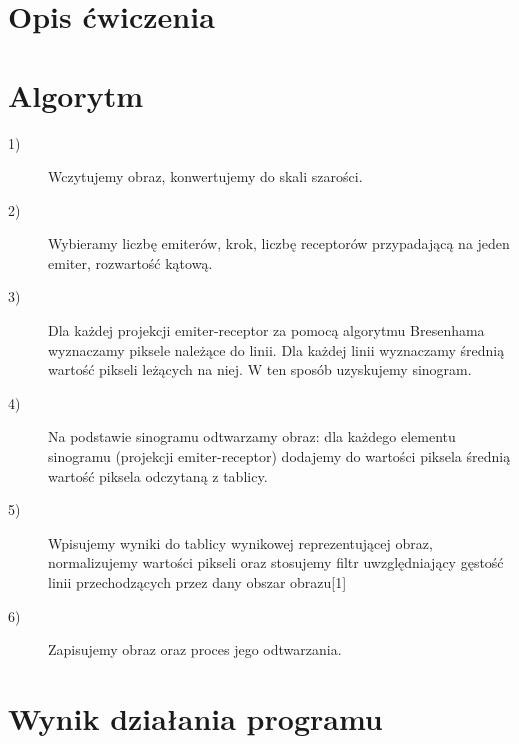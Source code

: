 \documentclass{article}
\begin{document}


\section{Opis ćwiczenia}


\section{Algorytm}
\begin{description}
\item[1)] Wczytujemy obraz, konwertujemy do skali szarości.
\item[2)] Wybieramy liczbę emiterów, krok, liczbę receptorów przypadającą na jeden emiter, rozwartość kątową.
\item[3)] Dla każdej projekcji emiter-receptor za pomocą algorytmu Bresenhama wyznaczamy piksele należące do linii. Dla każdej linii wyznaczamy średnią wartość pikseli leżących na niej. W ten sposób uzyskujemy sinogram.
\item[4)] Na podstawie sinogramu odtwarzamy obraz: dla każdego elementu sinogramu (projekcji emiter-receptor) dodajemy do wartości piksela średnią wartość piksela odczytaną z tablicy. 
\item[5)] Wpisujemy wyniki do tablicy wynikowej reprezentującej obraz, normalizujemy wartości pikseli oraz stosujemy filtr uwzględniający gęstość linii przechodzących przez dany obszar obrazu[1]
\item[6)] Zapisujemy obraz oraz proces jego odtwarzania.
\end{description}
 
\section{Wynik działania programu}
\end{document}
